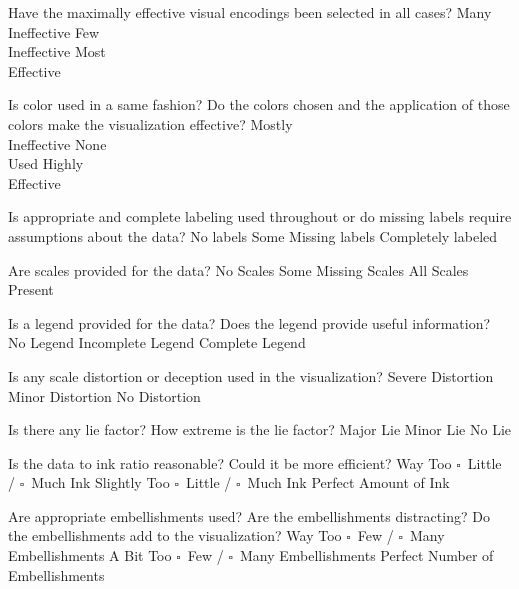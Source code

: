 \documentclass[a4paper,12pt]{article}
\begin{document}
	{Have the maximally effective visual encodings been selected in all cases? }
    {\choice Many\\Ineffective}
    {\choice Few\\Ineffective}
    {\choice Most\\Effective} 
        
	{Is color used in a same fashion? Do the colors chosen and the application 
    	of those colors make the visualization effective?}
    {\choice Mostly\\Ineffective}
    {\choice None\\Used}
    {\choice Highly\\Effective} 

\EndTable  

\vspace{15pt}


   	{Is appropriate and complete labeling used throughout or do 
      	missing labels require assumptions about the data?}
    {\choice No labels}
    {\choice Some Missing labels}
    {\choice Completely labeled} 
        
   	{Are scales provided for the data?}
	{\choice No Scales}
	{\choice Some Missing Scales}
	{\choice All Scales Present} 

	{Is a legend provided for the data? Does the legend provide useful 
    	information?}
	{\choice No Legend}
	{\choice Incomplete Legend}
	{\choice Complete Legend} 
        
        

	{Is any scale distortion or deception used in the visualization?}	
	{\choice Severe Distortion}
	{\choice Minor Distortion}
	{\choice No Distortion} 
        
	{Is there any lie factor? How extreme is the lie factor?}
	{\choice Major Lie}
	{\choice Minor Lie}
	{\choice No Lie} 

	{Is the data to ink ratio reasonable? Could it be more efficient?}
	{Way Too $\square$~Little / $\square$~Much Ink}
	{Slightly Too $\square$~Little / $\square$~Much Ink}
	{\choice Perfect Amount of Ink} 
        
	{Are appropriate embellishments used? Are the embellishments 
    	distracting? Do the embellishments add to the visualization?}
	{Way Too $\square$~Few / $\square$~Many Embellishments}
	{A Bit Too $\square$~Few / $\square$~Many Embellishments}
	{\choice Perfect Number of Embellishments} 
        
\end{document}

